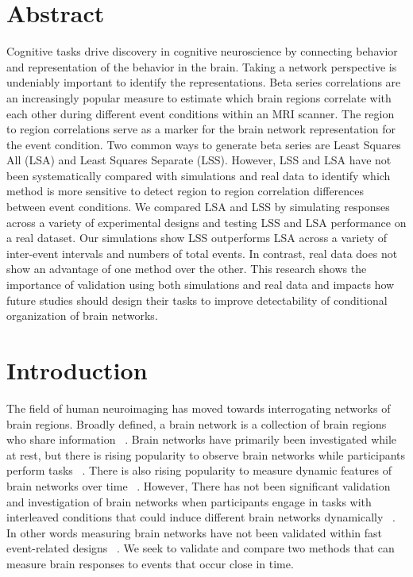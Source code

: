 \documentclass[10pt,letterpaper]{article}
\begin{document}
\section*{Abstract}
Cognitive tasks drive discovery in cognitive neuroscience by connecting behavior and representation
of the behavior in the brain.
Taking a network perspective is undeniably important to identify the representations.
Beta series correlations are an increasingly popular measure to estimate which brain regions correlate with
each other during different event conditions within an MRI scanner.
The region to region correlations serve as a marker for the brain network representation
for the event condition.
Two common ways to generate beta series are Least Squares All (LSA) and
Least Squares Separate (LSS).
However, LSS and LSA have not been systematically compared with simulations and real data
to identify which method is more sensitive to detect region to region correlation differences
between event conditions.
We compared LSA and LSS by simulating responses across a variety of
experimental designs and testing LSS and LSA performance on a real dataset.
Our simulations show LSS outperforms LSA across a variety of inter-event
intervals and numbers of total events.
In contrast, real data does not show an advantage of one method over the other.
This research shows the importance of validation using both simulations
and real data and impacts how future studies should design their tasks
to improve detectability of conditional organization of brain networks.

\linenumbers

\section*{Introduction}
\label{intro}

The field of human neuroimaging has moved towards interrogating networks of brain regions.
Broadly defined, a brain network is a collection of brain regions who share information ~\cite{Uddin2019}.
Brain networks have primarily been investigated while at rest, but there
is rising popularity to observe brain networks while participants perform tasks ~\cite{Cole2014a}.
There is also rising popularity to measure dynamic features of brain networks over time ~\cite{Sakoglu2008,Hindriks2016}.
However, There has not been significant validation and investigation of brain networks
when participants engage in tasks with interleaved conditions that could induce
different brain networks dynamically ~\cite{Di2019a}.
In other words measuring brain networks have not been validated within fast event-related designs ~\cite{Buckner1998}.
We seek to validate and compare two methods that can measure brain responses to events that occur
close in time.
\end{document}
